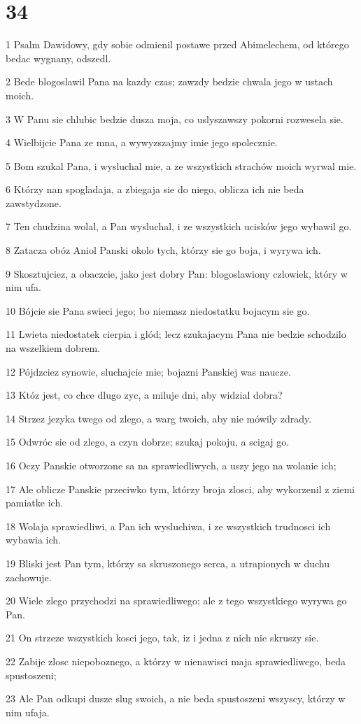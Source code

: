 \chapter{34}

\par 1 Psalm Dawidowy, gdy sobie odmienil postawe przed Abimelechem, od którego bedac wygnany, odszedl.
\par 2 Bede blogoslawil Pana na kazdy czas; zawzdy bedzie chwala jego w ustach moich.
\par 3 W Panu sie chlubic bedzie dusza moja, co uslyszawszy pokorni rozwesela sie.
\par 4 Wielbijcie Pana ze mna, a wywyzszajmy imie jego spolecznie.
\par 5 Bom szukal Pana, i wysluchal mie, a ze wszystkich strachów moich wyrwal mie.
\par 6 Którzy nan spogladaja, a zbiegaja sie do niego, oblicza ich nie beda zawstydzone.
\par 7 Ten chudzina wolal, a Pan wysluchal, i ze wszystkich ucisków jego wybawil go.
\par 8 Zatacza obóz Aniol Panski okolo tych, którzy sie go boja, i wyrywa ich.
\par 9 Skosztujciez, a obaczcie, jako jest dobry Pan: blogoslawiony czlowiek, który w nim ufa.
\par 10 Bójcie sie Pana swieci jego; bo niemasz niedostatku bojacym sie go.
\par 11 Lwieta niedostatek cierpia i glód; lecz szukajacym Pana nie bedzie schodzilo na wszelkiem dobrem.
\par 12 Pójdzciez synowie, sluchajcie mie; bojazni Panskiej was naucze.
\par 13 Któz jest, co chce dlugo zyc, a miluje dni, aby widzial dobra?
\par 14 Strzez jezyka twego od zlego, a warg twoich, aby nie mówily zdrady.
\par 15 Odwróc sie od zlego, a czyn dobrze; szukaj pokoju, a scigaj go.
\par 16 Oczy Panskie otworzone sa na sprawiedliwych, a uszy jego na wolanie ich;
\par 17 Ale oblicze Panskie przeciwko tym, którzy broja zlosci, aby wykorzenil z ziemi pamiatke ich.
\par 18 Wolaja sprawiedliwi, a Pan ich wysluchiwa, i ze wszystkich trudnosci ich wybawia ich.
\par 19 Bliski jest Pan tym, którzy sa skruszonego serca, a utrapionych w duchu zachowuje.
\par 20 Wiele zlego przychodzi na sprawiedliwego; ale z tego wszystkiego wyrywa go Pan.
\par 21 On strzeze wszystkich kosci jego, tak, iz i jedna z nich nie skruszy sie.
\par 22 Zabije zlosc niepoboznego, a którzy w nienawisci maja sprawiedliwego, beda spustoszeni;
\par 23 Ale Pan odkupi dusze slug swoich, a nie beda spustoszeni wszyscy, którzy w nim ufaja.


